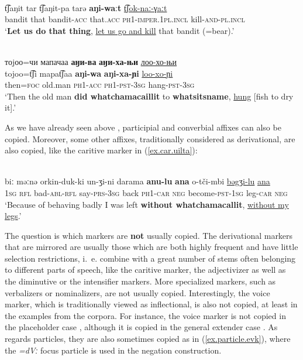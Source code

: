 \documentclass[output=paper,colorlinks,citecolor=brown
\ChapterDOI{10.5281/zenodo.15697577}
]{langscibook}
\begin{document}
 \ea 
 \label{ex.imp.evk}
 \\
 \gll t͡ʃaŋit	tar	t͡ʃaŋit-pa	tarə \textbf{aŋi-waːt}	\uline{t͡ʃok-naː-γaːt}\\
 bandit	that	bandit-\textsc{acc}	that.\textsc{acc} \textsc{ph1}-\textsc{imper.1pl.incl} kill-\textsc{and}-\textsc{pl.incl}\\
 \glt `\textbf{Let us do that thing}, \uline{let us go and kill} that bandit (=bear).'\\
 \z
{}



 \ea 
 \label{ex.allmarkers.oroch}
 \\
 \glll тоjоо=чи мапачаа \textbf{аӈи-ва} \textbf{аӈи-ха-њи} \uline{лоо-хо-њи}\\
 tojoo=t͡ʃi mapat͡ʃaa \textbf{aŋi-wa} \textbf{aŋi-xa-ɲi} \uline{loo-xo-ɲi}\\
then=\textsc{foc} old.man \textsc{ph1}-\textsc{acc} \textsc{ph1}-\textsc{pst}-3\textsc{sg} hang-\textsc{pst}-3\textsc{sg}\\
 \glt `Then the old man \textbf{did whatchamacaillit} to \textbf{whatsitsname}, \uline{hung} [fish to dry it].'
 \z
{}

As we have already seen above , participial and converbial affixes can also be copied. Moreover, some other affixes, traditionally considered as derivational, are also copied, like the caritive marker in (\ref{ex.car.uilta}):

 \ea \label{ex.car.uilta}
 \\
 \gll biː məːnə orkin-duk-ki un-ʒi-ni darama \textbf{anu-lu} \textbf{ana} o-tči-mbi \uline{bəgʒi-lu} \uline{ana}\\
\textsc{1sg} \textsc{rfl} bad-\textsc{abl}-\textsc{rfl} say-\textsc{prs}-\textsc{3sg} back \textsc{ph1}-\textsc{car} \textsc{neg} become-\textsc{pst}-\textsc{1sg} leg-\textsc{car} \textsc{neg}\\
 \glt `Because of behaving badly I was left \textbf{without whatchamacallit}, \uline{without my legs}.'
 \z
{}


The question is which markers are \textbf{not} usually copied. The derivational markers that are mirrored are usually those which are both highly frequent and have little selection restrictions, i.~e. combine with a great number of stems often belonging to different parts of speech, like the caritive marker, the adjectivizer as well as the diminutive or the intensifier markers. More specialized markers, such as verbalizers or nominalizers, are not usually copied. Interestingly, the voice marker, which is traditionally viewed as inflectional, is also not copied, at least in the examples from the corpora. For instance, the voice marker is not copied in the placeholder case , although it is copied in the general extender case . As regards particles, they are also sometimes copied as in (\ref{ex.particle.evk}), where the \textit{=dVː} focus particle is used in the negation construction.
\end{document}
